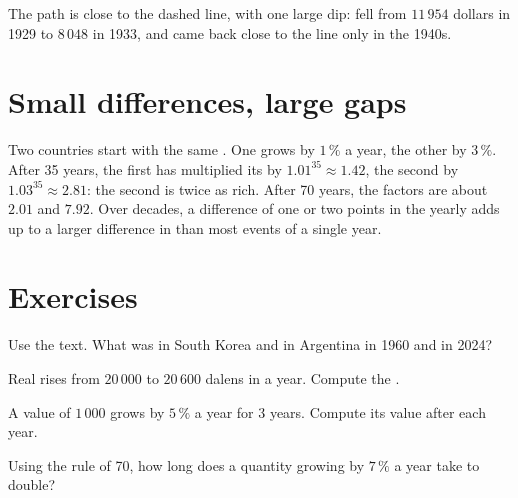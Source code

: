 The path is close to the dashed line, with one large dip:  fell from $11\,954$
dollars in 1929 to $8\,048$ in 1933, and came back close to the line only in the 1940s.

\section{Small differences, large gaps}

Two countries start with the same . One grows by $1\,\%$ a year, the other by
$3\,\%$. After 35 years, the first has multiplied its  by $1.01^{35} \approx 1.42$, the
second by $1.03^{35} \approx 2.81$: the second is twice as rich. After 70 years, the factors are
about $2.01$ and $7.92$. Over decades, a difference of one or two points in the yearly 
adds up to a larger difference in  than most events of a single year.

\section{Exercises}

\begin{exercise}[$\star$]\label{exo:g8:growth-and-compounding:1}
Use the text. What was  in South Korea and in Argentina in 1960 and in 2024?
\end{exercise}

\begin{exercise}[$\star$]\label{exo:g8:growth-and-compounding:2}
Real  rises from $20\,000$ to $20\,600$ dalens in a year. Compute the .
\end{exercise}

\begin{exercise}[$\star$]\label{exo:g8:growth-and-compounding:3}
A value of $1\,000$ grows by $5\,\%$ a year for 3 years. Compute its value after each year.
\end{exercise}

\begin{exercise}[$\star$]\label{exo:g8:growth-and-compounding:4}
Using the rule of 70, how long does a quantity growing by $7\,\%$ a year take to double?
\end{exercise}

